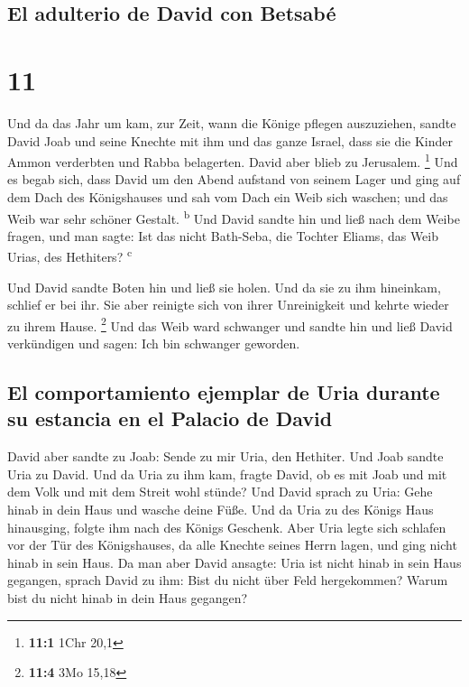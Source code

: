 \hypertarget{el-adulterio-de-david-con-betsabuxe9}{%
\subsection{El adulterio de David con
Betsabé}\label{el-adulterio-de-david-con-betsabuxe9}}

\hypertarget{section-10}{%
\section{11}\label{section-10}}

 Und da das Jahr um kam, zur Zeit, wann die Könige pflegen
auszuziehen, sandte David Joab und seine Knechte mit ihm und das ganze
Israel, dass sie die Kinder Ammon verderbten und Rabba belagerten. David
aber blieb zu Jerusalem. \footnote{\textbf{11:1} 1Chr 20,1}
 Und es begab sich, dass David um den Abend aufstand von
seinem Lager und ging auf dem Dach des Königshauses und sah vom Dach ein
Weib sich waschen; und das Weib war sehr schöner Gestalt.
\textsuperscript{b}  Und David sandte hin und ließ nach
dem Weibe fragen, und man sagte: Ist das nicht Bath-Seba, die Tochter
Eliams, das Weib Urias, des Hethiters? \textsuperscript{c}

 Und David sandte Boten hin und ließ sie holen. Und da sie
zu ihm hineinkam, schlief er bei ihr. Sie aber reinigte sich von ihrer
Unreinigkeit und kehrte wieder zu ihrem Hause. \footnote{\textbf{11:4}
  3Mo 15,18}  Und das Weib ward schwanger und sandte hin
und ließ David verkündigen und sagen: Ich bin schwanger geworden.

\hypertarget{el-comportamiento-ejemplar-de-uria-durante-su-estancia-en-el-palacio-de-david}{%
\subsection{El comportamiento ejemplar de Uria durante su estancia en el
Palacio de
David}\label{el-comportamiento-ejemplar-de-uria-durante-su-estancia-en-el-palacio-de-david}}

 David aber sandte zu Joab: Sende zu mir Uria, den
Hethiter. Und Joab sandte Uria zu David.  Und da Uria zu
ihm kam, fragte David, ob es mit Joab und mit dem Volk und mit dem
Streit wohl stünde?  Und David sprach zu Uria: Gehe hinab
in dein Haus und wasche deine Füße. Und da Uria zu des Königs Haus
hinausging, folgte ihm nach des Königs Geschenk.  Aber
Uria legte sich schlafen vor der Tür des Königshauses, da alle Knechte
seines Herrn lagen, und ging nicht hinab in sein Haus. 
Da man aber David ansagte: Uria ist nicht hinab in sein Haus gegangen,
sprach David zu ihm: Bist du nicht über Feld hergekommen? Warum bist du
nicht hinab in dein Haus gegangen?


